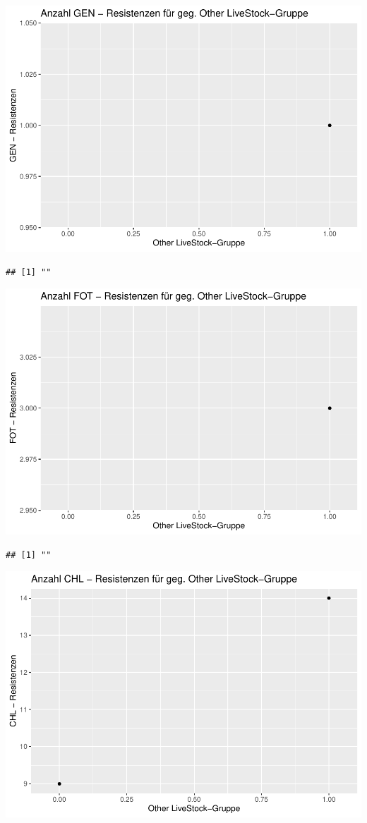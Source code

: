 \documentclass[
]{article}
\begin{document}
\includegraphics{NResistenzen_files/figure-latex/unnamed-chunk-7-14.pdf}

\begin{verbatim}
## [1] ""
\end{verbatim}

\includegraphics{NResistenzen_files/figure-latex/unnamed-chunk-7-15.pdf}

\begin{verbatim}
## [1] ""
\end{verbatim}

\includegraphics{NResistenzen_files/figure-latex/unnamed-chunk-7-16.pdf}
\end{document}
